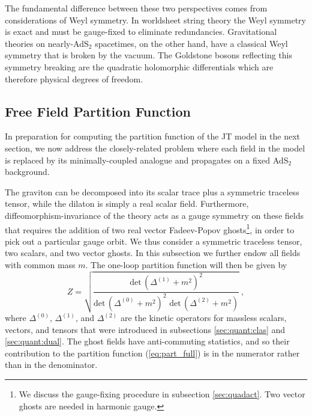 \documentclass[12pt]{article}
\begin{document}
The fundamental difference between these two perspectives comes from considerations of Weyl symmetry.  In worldsheet string theory the Weyl symmetry is exact and must be gauge-fixed to eliminate redundancies.  Gravitational theories on nearly-AdS$_2$ spacetimes, on the other hand, have a classical Weyl symmetry that is broken by the vacuum.  The Goldstone bosons reflecting this symmetry breaking are the quadratic holomorphic differentials which are therefore physical degrees of freedom.

\subsection{Free Field Partition Function}

In preparation for computing the partition function of the JT model in the next section, we now address the closely-related problem where each field in the model is 
replaced by its minimally-coupled analogue and propagates on a fixed AdS$_2$ background.  

The graviton can be decomposed into its scalar trace plus a symmetric traceless tensor, while the dilaton is simply a real scalar field. Furthermore, diffeomorphism-invariance of the theory acts as a gauge symmetry on these fields that requires the addition of two real vector Fadeev-Popov ghosts\footnote{We discuss the gauge-fixing procedure in subsection \ref{sec:quadact}. Two vector ghosts are needed in harmonic gauge.}, in order to pick out a particular gauge orbit.
We thus consider a symmetric traceless tensor, two scalars, and two vector ghosts. In this subsection we further endow all fields with common mass $m$. The one-loop partition function will then be given by
%
\begin{equation}
	Z = \sqrt{\frac{\text{det}\,(\Delta^{(1)} + m^2 )^2}{\text{det}\,(\Delta^{(0)} + m^2)^2\,\,\text{det}\,(\Delta^{(2)} + m^2)}}~,
\label{eq:part_full}
\end{equation}
%
where $\Delta^{(0)}$, $\Delta^{(1)}$, and $\Delta^{(2)}$ are the kinetic operators for massless scalars, vectors, and tensors that 
were introduced in subsections \ref{sec:quant:clas} and \ref{sec:quant:dual}. The ghost fields have anti-commuting statistics, and so their contribution to the partition function (\ref{eq:part_full}) is in the numerator rather than in the denominator.
\end{document}
